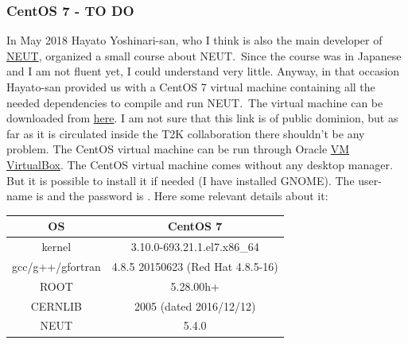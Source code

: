 \subsubsection{CentOS 7 - TO DO}
In May 2018 Hayato Yoshinari-san, who I think is also the main developer of
\href{https://inspirehep.net/record/844435?ln=en}{NEUT}, organized a small
course about NEUT.\ Since the course was in Japanese and I am not fluent yet, I
could understand very little. Anyway, in that occasion Hayato-san provided us
with a CentOS 7 virtual machine containing all the needed dependencies to
compile and run NEUT.\ The virtual machine can be downloaded from
\href{https://tinyurl.com/y8hy9kyr}{here}. I am not sure that this link is of
public dominion, but as far as it is circulated inside the T2K collaboration
there shouldn't be any problem.  The CentOS virtual machine can be run through
Oracle \href{http://www.oracle.com/technetwork/server-storage/%
  virtualbox/downloads/index.html}{VM VirtualBox}.  The CentOS virtual machine
comes without any desktop manager. But it is possible to install it if needed (I
have installed GNOME). The user-name is  and the password is
. Here some relevant details about it:
\begin{center}
  \begin{tabular}{||c | c||} %
    \hline %
    OS & CentOS 7 \\ [0.5ex] 
    \hline\hline %
    kernel & 3.10.0-693.21.1.el7.x86\_64 \\
    \hline %
    gcc/g++/gfortran & 4.8.5 20150623 (Red Hat 4.8.5-16) \\ 
    \hline %
    ROOT & 5.28.00h+\\
    \hline %
    CERNLIB & 2005 (dated 2016/12/12) \\
    \hline %
    NEUT & 5.4.0 \\ [1ex] 
    \hline
  \end{tabular}
\end{center}

